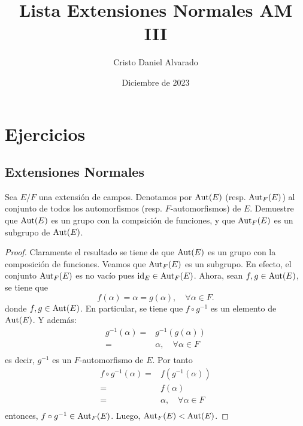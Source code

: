 \documentclass[12pt]{report}
\theoremstyle{largebreak}
\begin{document}
    \setlength{\parskip}{5pt} %
    \setlength{\parindent}{12pt} %
    \title{Lista Extensiones Normales AM III}
    \author{Cristo Daniel Alvarado}
    \date{Diciembre de 2023}
    \maketitle

\setcounter{chapter}{2}

\chapter{Ejercicios}

\section{Extensiones Normales}

\begin{excer}
    Sea $E/F$ una extensión de campos. Denotamos por $\textup{Aut}(E)$ (resp. $\textup{Aut}_F(E)$) al conjunto de todos los automorfismos (resp. $F$-automorfismos) de $E$. Demuestre que $\textup{Aut}(E)$ es un grupo con la compsición de funciones, y que $\textup{Aut}_F(E)$ es un subgrupo de $\textup{Aut}(E)$.
\end{excer}

\begin{proof}
    Claramente el resultado se tiene de que $\textup{Aut}(E)$ es un grupo con la composición de funciones. Veamos que $\textup{Aut}_F(E)$ es un subgrupo. En efecto, el conjunto $\textup{Aut}_F(E)$ es no vacío pues $\textup{id}_E\in\textup{Aut}_F(E)$. Ahora, sean $f,g\in\textup{Aut}(E)$, se tiene que
    \begin{equation}
        f(\alpha)=\alpha=g(\alpha),\quad\forall \alpha\in F.
    \end{equation}
    donde $f,g\in \textup{Aut}(E)$. En particular, se tiene que $f\circ g^{-1}$ es un elemento de $\textup{Aut}(E)$. Y además:
    \begin{equation}
        \begin{split}
            g^{-1}(\alpha)=&g^{-1}(g(\alpha))\\
            =&\alpha,\quad \forall\alpha\in F\\
        \end{split}
    \end{equation}
    es decir, $g^{-1}$ es un $F$-automorfismo de $E$. Por tanto
    \begin{equation}
        \begin{split}
            f\circ g^{-1}(\alpha)=&f(g^{-1}(\alpha))\\
            =&f(\alpha)\\
            =&\alpha,\quad \forall \alpha\in F\\
        \end{split}
    \end{equation}
    entonces, $f\circ g^{-1}\in \textup{Aut}_F(E)$. Luego, $\textup{Aut}_F(E)<\textup{Aut}(E)$.
\end{proof}
\end{document}

